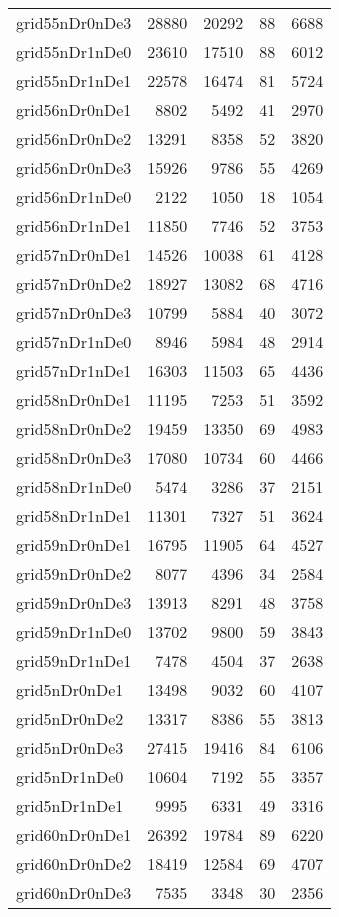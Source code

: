 \begin{longtable}{lrrrr}
grid55nDr0nDe3 & 28880 & 20292 & 88 & 6688 \\
grid55nDr1nDe0 & 23610 & 17510 & 88 & 6012 \\
grid55nDr1nDe1 & 22578 & 16474 & 81 & 5724 \\
grid56nDr0nDe1 & 8802 & 5492 & 41 & 2970 \\
grid56nDr0nDe2 & 13291 & 8358 & 52 & 3820 \\
grid56nDr0nDe3 & 15926 & 9786 & 55 & 4269 \\
grid56nDr1nDe0 & 2122 & 1050 & 18 & 1054 \\
grid56nDr1nDe1 & 11850 & 7746 & 52 & 3753 \\
grid57nDr0nDe1 & 14526 & 10038 & 61 & 4128 \\
grid57nDr0nDe2 & 18927 & 13082 & 68 & 4716 \\
grid57nDr0nDe3 & 10799 & 5884 & 40 & 3072 \\
grid57nDr1nDe0 & 8946 & 5984 & 48 & 2914 \\
grid57nDr1nDe1 & 16303 & 11503 & 65 & 4436 \\
grid58nDr0nDe1 & 11195 & 7253 & 51 & 3592 \\
grid58nDr0nDe2 & 19459 & 13350 & 69 & 4983 \\
grid58nDr0nDe3 & 17080 & 10734 & 60 & 4466 \\
grid58nDr1nDe0 & 5474 & 3286 & 37 & 2151 \\
grid58nDr1nDe1 & 11301 & 7327 & 51 & 3624 \\
grid59nDr0nDe1 & 16795 & 11905 & 64 & 4527 \\
grid59nDr0nDe2 & 8077 & 4396 & 34 & 2584 \\
grid59nDr0nDe3 & 13913 & 8291 & 48 & 3758 \\
grid59nDr1nDe0 & 13702 & 9800 & 59 & 3843 \\
grid59nDr1nDe1 & 7478 & 4504 & 37 & 2638 \\
grid5nDr0nDe1 & 13498 & 9032 & 60 & 4107 \\
grid5nDr0nDe2 & 13317 & 8386 & 55 & 3813 \\
grid5nDr0nDe3 & 27415 & 19416 & 84 & 6106 \\
grid5nDr1nDe0 & 10604 & 7192 & 55 & 3357 \\
grid5nDr1nDe1 & 9995 & 6331 & 49 & 3316 \\
grid60nDr0nDe1 & 26392 & 19784 & 89 & 6220 \\
grid60nDr0nDe2 & 18419 & 12584 & 69 & 4707 \\
grid60nDr0nDe3 & 7535 & 3348 & 30 & 2356 \\

\end{longtable}
